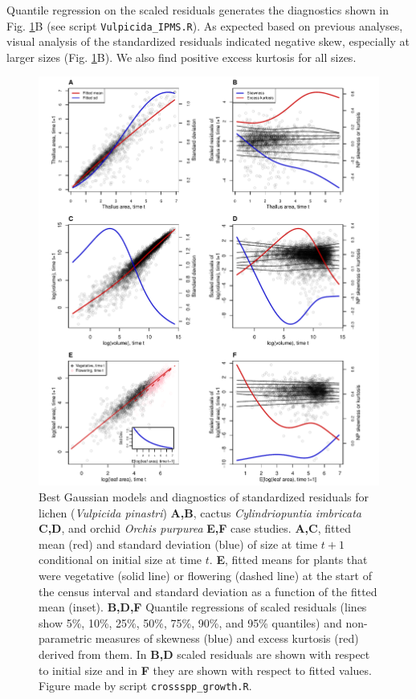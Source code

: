 \documentclass[12pt]{article}
\begin{document}
Quantile regression on the scaled residuals generates the diagnostics shown in Fig. \ref{fig:resid_diagnostics}B (see script \texttt{Vulpicida\_IPMS.R}).
As expected based on previous analyses, visual analysis of the standardized residuals indicated negative skew, especially at larger sizes (Fig. \ref{fig:resid_diagnostics}B).
We also find positive excess kurtosis for all sizes. 
\begin{figure}[tbp]
	\centering
	\includegraphics[width=1.0\textwidth]{figures/combo_resid_diagnostics.pdf}
	\caption{Best Gaussian models and diagnostics of standardized residuals for lichen (\emph{Vulpicida pinastri}) \textbf{A,B}, cactus \emph{Cylindriopuntia imbricata} \textbf{C,D}, and orchid \emph{Orchis purpurea} \textbf{E,F} case studies. \textbf{A,C}, fitted mean (red) and standard deviation (blue) of size at time $t+1$ conditional on initial size at time $t$. \textbf{E}, fitted means for plants that were vegetative (solid line) or flowering (dashed line) at the start of the census interval and standard deviation as a function of the fitted mean (inset). \textbf{B,D,F} Quantile regressions of scaled residuals (lines show 5\%, 10\%, 25\%, 50\%, 75\%, 90\%, and 95\% quantiles) and non-parametric measures of skewness (blue) and excess kurtosis (red) derived from them. In \textbf{B,D} scaled residuals are shown with respect to initial size and in \textbf{F} they are shown with respect to fitted values. Figure made by script \texttt{crossspp\_growth.R}.}
	\label{fig:resid_diagnostics}
\end{figure}
\end{document}
